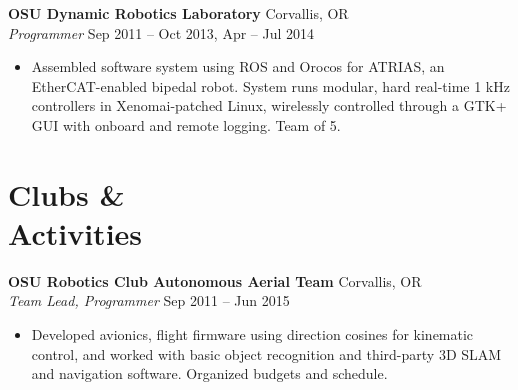 \documentclass[10pt,letterpaper,margin]{res}
\newcommand{\org}[2]{{\bf #1} \hfill {\color{lightgray} #2} \\}
\newcommand{\pos}[2]{\small {\it #1} \hfill {\color{lightgray} #2} \vspace{0.0em}}
\begin{document}
\begin{resume}
\org {OSU Dynamic Robotics Laboratory} {Corvallis, OR}
\pos {Programmer} {Sep 2011 -- Oct 2013, Apr -- Jul 2014}

\begin{itemize}
  \item Assembled software system using ROS and Orocos for ATRIAS, an
    EtherCAT-enabled bipedal robot. System runs modular, hard real-time 1 kHz
    controllers in Xenomai-patched Linux, wirelessly controlled through a GTK+
    GUI with onboard and remote logging. Team of 5.
\end{itemize}

% 



\section{Clubs \& \\ Activities}

\org {OSU Robotics Club Autonomous Aerial Team} {Corvallis, OR}
\pos {Team Lead, Programmer} {Sep 2011 -- Jun 2015}

\begin{itemize}
  \item Developed avionics, flight firmware using direction cosines for
    kinematic control, and worked with basic object recognition and third-party
    3D SLAM and navigation software. Organized budgets and schedule.
\end{itemize}



%
%



\end{resume}
\end{document}
